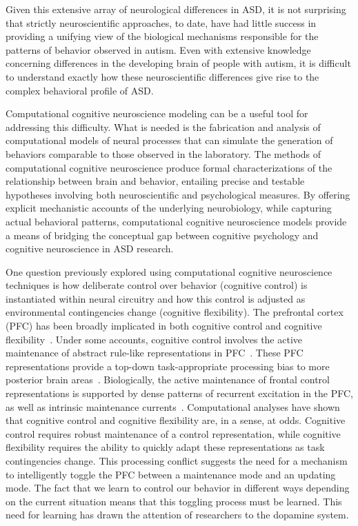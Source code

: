 Given this extensive array of neurological differences in ASD, it is not surprising that strictly neuroscientific approaches, to date, have had little success in providing a unifying view of the biological mechanisms responsible for the patterns of behavior observed in autism. Even with extensive knowledge concerning differences in the developing brain of people with autism, it is difficult to understand exactly how these neuroscientific differences give rise to the complex behavioral profile of ASD.

Computational cognitive neuroscience modeling can be a useful tool for addressing this difficulty. What is needed is the fabrication and analysis of computational models of neural processes that can simulate the generation of behaviors comparable to those observed in the laboratory. The methods of computational cognitive neuroscience produce formal characterizations of the relationship between brain and behavior, entailing precise and testable hypotheses involving both neuroscientific and psychological measures. By offering explicit mechanistic accounts of the underlying neurobiology, while capturing actual behavioral patterns, computational cognitive neuroscience models provide a means of bridging the conceptual gap between cognitive psychology and cognitive neuroscience in ASD research.

One question previously explored using computational cognitive neuroscience techniques is how deliberate control over behavior (cognitive control) is instantiated within neural circuitry and how this control is adjusted as environmental contingencies change (cognitive flexibility). The prefrontal cortex (PFC) has been broadly implicated in both cognitive control and cognitive flexibility~\cite{StussDT:2000:WCSTLesion,StussDT:2001:StroopLesion}. Under some accounts, cognitive control involves the active maintenance of abstract rule-like representations in PFC~\cite{NoelleDC:2012:Rules}. These PFC representations provide a top-down task-appropriate processing bias to more posterior brain areas~\cite{CohenJD:1990:Stroop,MillerEK:2001:PFC}. Biologically, the active maintenance of frontal control representations is supported by dense patterns of recurrent excitation in the PFC, as well as intrinsic maintenance currents~\cite{GoldmanRakicPS:1987:PFCMaintenance,LevittJB:1993:Stripes,WangM:2004:D2}. Computational analyses have shown that cognitive control and cognitive flexibility are, in a sense, at odds. Cognitive control requires robust maintenance of a control representation, while cognitive flexibility requires the ability to quickly adapt these representations as task contingencies change. This processing conflict suggests the need for a mechanism to intelligently toggle the PFC between a maintenance mode and an updating mode. The fact that we learn to control our behavior in different ways depending on the current situation means that this toggling process must be learned. This need for learning has drawn the attention of researchers to the dopamine system.   

